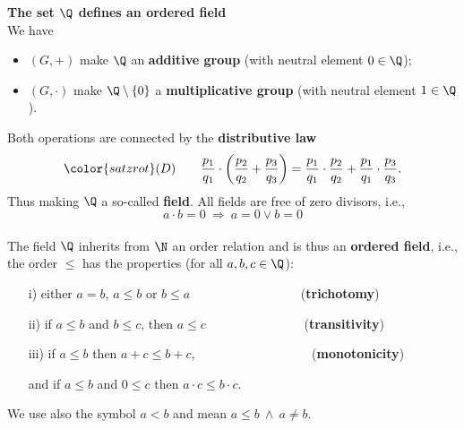 {\begin{itemize}
\textbf{\large The set $\Q$ defines an ordered field}\\
We have
\begin{itemize}
\item $(G,+)$ make $\Q$ an \textbf{additive group} (with neutral element $0\in\Q$);
\item $(G,\cdot)$ make $\Q\setminus\{0\}$ a \textbf{multiplicative group} (with neutral element $1\in \Q$).
\end{itemize}
Both operations are connected by the \textbf{distributive law}
\[\color{satzrot}
(D)\qquad \frac{p_1}{q_1}\cdot \left(\frac{p_2}{q_2}+\frac{p_3}{q_3}\right)=
\frac{p_1}{q_1}\cdot \frac{p_2}{q_2}+\frac{p_1}{q_1}\cdot \frac{p_3}{q_3}.
\]
Thus making $\Q$ a so-called \textbf{\textbf{field}}. All fields are free of zero divisors, i.e.,
\color{satzrot}
\[
a\cdot b=0\ \Rightarrow\  a=0\vee b=0
\]
%
~\\
\color{black}
The field $\Q$ inherits from $\N$ an order relation and is thus an \textbf{\textbf{ordered field}}, i.e., the order  $\le$ has the properties (for all $a,b,c\in\Q$):
\begin{itemize}\color{defgruen}
\item[i)] either $a=b$, $a \le b$ or $b\le a$ ~~~~~~~~~~~~~~~~~(\textbf{trichotomy})
\item[ii)] if $a\le b$ and $b\le c$, then $a\le c$ ~~~~~~~~~~~~~~~(\textbf{transitivity})
\item[iii)]  if $a\le b$ then $a+c\le b+c$, ~~~~~~~~~~~~~~~~~~(\textbf{monotonicity})
\item[] and if $a\le b$ and $0\le c$ then $a\cdot c\le b\cdot c$.
\end{itemize}
We use also the symbol $a<b$ and mean $a\le b~\wedge ~a\neq b$.


\end{itemize}}
